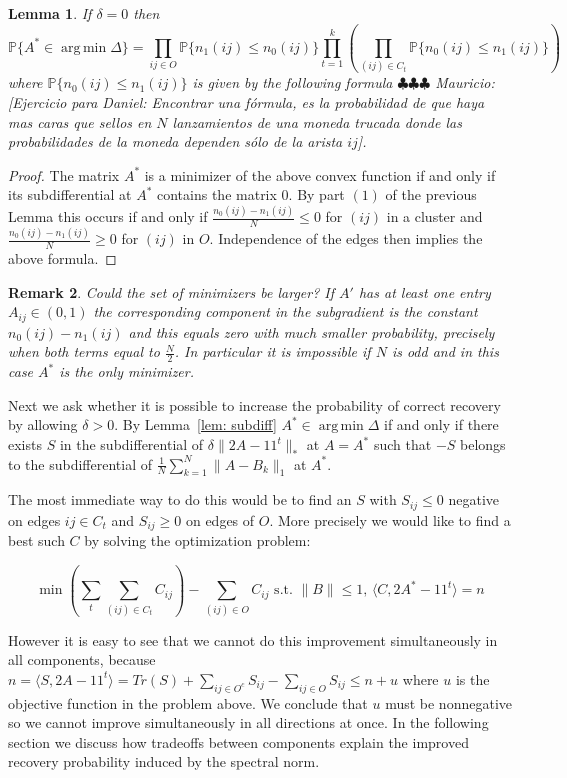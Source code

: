 \documentclass[12pt]{amsart}
\newtheorem{lemma}{Lemma}[section]
\newtheorem{remark}[lemma]{Remark}
\numberwithin{equation}{section}
\DeclareMathOperator*{\argmin}{arg\,min}
\newcommand{\PP}{\mathbb{P}}
\newcommand{\mv}[1]{{\color{red} \sf $\clubsuit\clubsuit\clubsuit$ Mauricio: [#1]}}
\begin{document}
\begin{lemma} If $\delta=0$ then 
\[\PP\{A^*\in\argmin\Delta \} =\prod_{ij\in O} \PP\{n_1(ij)\leq n_0(ij)\} \prod_{t=1}^k \left(\prod_{(ij)\in C_t}\PP\{n_0(ij)\leq n_1(ij)\}\right)\]
where $\PP\{n_0(ij)\leq n_1(ij)\}$ is given by the following formula 
\mv{Ejercicio para Daniel: Encontrar una f\'ormula, es la probabilidad de que haya mas caras que sellos en $N$ lanzamientos de una moneda trucada donde las probabilidades de la moneda dependen s\'olo de la arista $ij$}.
\end{lemma}
\begin{proof} The matrix $A^*$ is a minimizer of the above convex function if and only if its subdifferential at $A^*$ contains the matrix $0$. By part $(1)$ of the previous Lemma this occurs if and only if $\frac{n_0(ij)-n_1(ij)}{N}\leq 0$ for $(ij)$ in a cluster and 
$\frac{n_0(ij)-n_1(ij)}{N}\geq 0$ for $(ij)$ in $O$. Independence of the edges then implies the above formula.  
\end{proof}
\begin{remark} Could the set of minimizers be larger? If $A'$ has at least one entry $A_{ij}\in (0,1)$ the corresponding component in the subgradient is the constant $n_0(ij)-n_1(ij)$ and this equals zero with much smaller probability, precisely when both terms equal to $\frac{N}{2}$. In particular it is impossible if $N$ is odd and in this case $A^*$ is the only minimizer.
\end{remark}

Next we ask whether it is possible to increase the probability of correct recovery by allowing $\delta>0$. By Lemma~\ref{lem: subdiff} $A^*\in \argmin \Delta$ if and only if there exists $S$ in the subdifferential of $\delta\|2A-11^t\|_*$ at $A=A^*$ such that $-S$ belongs to the subdifferential of $\frac{1}{N}\sum_{k=1}^N\|A-B_k\|_1$ at $A^*$. 

The most immediate way to do this would be to find an $S$ with $S_{ij}\leq 0$ negative on edges $ij\in C_t$ and $S_{ij}\geq 0$ on edges of $O$. More precisely we would like to find a best such $C$ by solving the optimization problem:

\[
\min \left(\sum_{t}\sum_{(ij)\in C_t} C_{ij}\right)-\sum_{(ij)\in O} C_{ij} \text{ s.t. $\|B\|\leq 1$, $\langle C, 2A^*-11^t\rangle = n$} 
\]

However it is easy to see that we cannot do this improvement simultaneously in all components, because $n=\langle S, 2A-11^t\rangle = Tr(S)+\sum_{ij \in O^c} S_{ij} -\sum_{ij \in O} S_{ij}\leq n+u$ where $u$ is the objective function in the problem above. We conclude that $u$ must be nonnegative so we cannot improve simultaneously in all directions at once.
In the following section we discuss how tradeoffs between components explain the improved recovery probability induced by the spectral norm.
\end{document}

